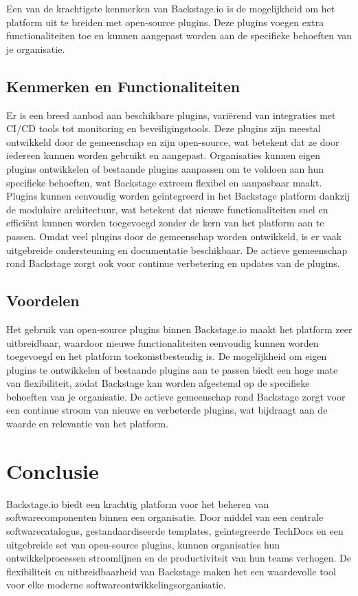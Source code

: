 Een van de krachtigste kenmerken van Backstage.io is de mogelijkheid om het platform uit te breiden met open-source plugins. Deze plugins voegen extra functionaliteiten toe en kunnen aangepast worden aan de specifieke behoeften van je organisatie.

\subsection{Kenmerken en Functionaliteiten}

Er is een breed aanbod aan beschikbare plugins, variërend van integraties met CI/CD tools tot monitoring en beveiligingstools. Deze plugins zijn meestal ontwikkeld door de gemeenschap en zijn open-source, wat betekent dat ze door iedereen kunnen worden gebruikt en aangepast. Organisaties kunnen eigen plugins ontwikkelen of bestaande plugins aanpassen om te voldoen aan hun specifieke behoeften, wat Backstage extreem flexibel en aanpasbaar maakt. Plugins kunnen eenvoudig worden geïntegreerd in het Backstage platform dankzij de modulaire architectuur, wat betekent dat nieuwe functionaliteiten snel en efficiënt kunnen worden toegevoegd zonder de kern van het platform aan te passen. Omdat veel plugins door de gemeenschap worden ontwikkeld, is er vaak uitgebreide ondersteuning en documentatie beschikbaar. De actieve gemeenschap rond Backstage zorgt ook voor continue verbetering en updates van de plugins.

\subsection{Voordelen}

Het gebruik van open-source plugins binnen Backstage.io maakt het platform zeer uitbreidbaar, waardoor nieuwe functionaliteiten eenvoudig kunnen worden toegevoegd en het platform toekomstbestendig is. De mogelijkheid om eigen plugins te ontwikkelen of bestaande plugins aan te passen biedt een hoge mate van flexibiliteit, zodat Backstage kan worden afgestemd op de specifieke behoeften van je organisatie. De actieve gemeenschap rond Backstage zorgt voor een continue stroom van nieuwe en verbeterde plugins, wat bijdraagt aan de waarde en relevantie van het platform.

\section{Conclusie}

Backstage.io biedt een krachtig platform voor het beheren van softwarecomponenten binnen een organisatie. Door middel van een centrale softwarecatalogus, gestandaardiseerde templates, geïntegreerde TechDocs en een uitgebreide set van open-source plugins, kunnen organisaties hun ontwikkelprocessen stroomlijnen en de productiviteit van hun teams verhogen. De flexibiliteit en uitbreidbaarheid van Backstage maken het een waardevolle tool voor elke moderne softwareontwikkelingsorganisatie.